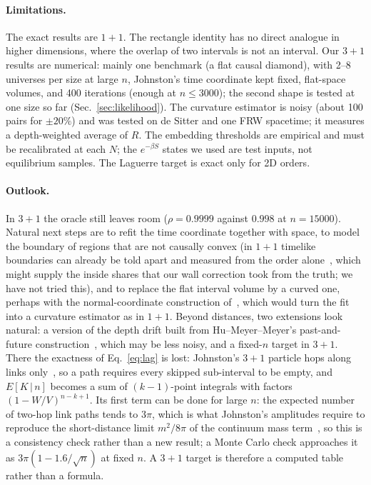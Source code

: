 \documentclass[11pt,a4paper]{article}
\begin{document}
\paragraph{Limitations.} The exact results are $1+1$. The rectangle identity has no direct analogue in higher dimensions, where the overlap of two intervals is not an interval. Our $3+1$ results are numerical: mainly one benchmark (a flat causal diamond), with 2--8 universes per size at large $n$, Johnston's time coordinate kept fixed, flat-space volumes, and 400 iterations (enough at $n\le3000$); the second shape is tested at one size so far (Sec.~\ref{sec:likelihood}). The curvature estimator is noisy (about 100 pairs for $\pm20\%$) and was tested on de Sitter and one FRW spacetime; it measures a depth-weighted average of $R$. The embedding thresholds are empirical and must be recalibrated at each $N$; the $e^{-\beta S}$ states we used are test inputs, not equilibrium samples. The Laguerre target is exact only for 2D orders.

\paragraph{Outlook.} In $3+1$ the oracle still leaves room ($\rho=0.9999$ against $0.998$ at $n=15000$). Natural next steps are to refit the time coordinate together with space, to model the boundary of regions that are not causally convex (in $1+1$ timelike boundaries can already be told apart and measured from the order alone~\cite{Cunningham18}, which might supply the inside shares that our wall correction took from the truth; we have not tried this), and to replace the flat interval volume by a curved one, perhaps with the normal-coordinate construction of~\cite{Madsen26}, which would turn the fit into a curvature estimator as in $1+1$. Beyond distances, two extensions look natural: a version of the depth drift built from Hu--Meyer--Meyer's past-and-future construction~\cite{HMM25}, which may be less noisy, and a fixed-$n$ target in $3+1$. There the exactness of Eq.~\eqref{eq:lag} is lost: Johnston's $3+1$ particle hops along links only~\cite{Johnston08}, so a path requires every skipped sub-interval to be empty, and $E[K\,|\,n]$ becomes a sum of $(k-1)$-point integrals with factors $(1-W/V)^{n-k+1}$. Its first term can be done for large $n$: the expected number of two-hop link paths tends to $3\pi$, which is what Johnston's amplitudes require to reproduce the short-distance limit $m^2/8\pi$ of the continuum mass term~\cite{Johnston08}, so this is a consistency check rather than a new result; a Monte Carlo check approaches it as $3\pi(1-1.6/\sqrt n)$ at fixed $n$. A $3+1$ target is therefore a computed table rather than a formula.
\end{document}

